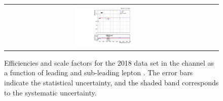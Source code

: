 \begin{figure}[htb]
\begin{center}
\begin{tabular}{ccc}
      \includegraphics[width=0.30\textwidth]{fig_2018_TrigSF/g_ee_lepBpt_FullSystUncBand.pdf}\\
    \end{tabular}
    \caption{Efficiencies and scale factors for the 2018 data set in the \ee channel as a function of leading and sub-leading lepton \pT.
            The error bars indicate the statistical uncertainty, and the shaded band corresponds to the systematic uncertainty.
            }
    \label{TrigSF_2018_2}
  \end{center}
\end{figure}


